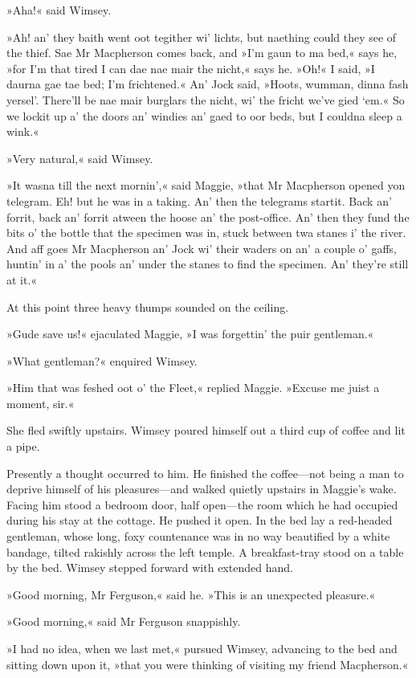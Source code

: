 »Aha!« said Wimsey.

»Ah! an' they baith went oot tegither wi' lichts, but naething could they see of the thief. Sae Mr Macpherson comes back, and »I'm gaun to ma bed,« says he, »for I'm that tired I can dae nae mair the nicht,« says he. »Oh!« I said, »I daurna gae tae bed; I'm frichtened.« An' Jock said, »Hoots, wumman, dinna fash yersel'. There'll be nae mair burglars the nicht, wi' the fricht we've gied `em.« So we lockit up a' the doors an' windies an' gaed to oor beds, but I couldna sleep a wink.«

»Very natural,« said Wimsey.

»It wasna till the next mornin',« said Maggie, »that Mr Macpherson opened yon telegram. Eh! but he was in a taking. An' then the telegrams startit. Back an' forrit, back an' forrit atween the hoose an' the post-office. An' then they fund the bits o' the bottle that the specimen was in, stuck between twa stanes i' the river. And aff goes Mr Macpherson an' Jock wi' their waders on an' a couple o' gaffs, huntin' in a' the pools an' under the stanes to find the specimen. An' they're still at it.«

At this point three heavy thumps sounded on the ceiling.

»Gude save us!« ejaculated Maggie, »I was forgettin' the puir gentleman.«

»What gentleman?« enquired Wimsey.

»Him that was feshed oot o' the Fleet,« replied Maggie. »Excuse me juist a moment, sir.«

She fled swiftly upstairs. Wimsey poured himself out a third cup of coffee and lit a pipe.

Presently a thought occurred to him. He finished the coffee—not being a man to deprive himself of his pleasures—and walked quietly upstairs in Maggie's wake. Facing him stood a bedroom door, half open—the room which he had occupied during his stay at the cottage. He pushed it open. In the bed lay a red-headed gentleman, whose long, foxy countenance was in no way beautified by a white bandage, tilted rakishly across the left temple. A breakfast-tray stood on a table by the bed. Wimsey stepped forward with extended hand.

»Good morning, Mr Ferguson,« said he. »This is an unexpected pleasure.«

»Good morning,« said Mr Ferguson snappishly.

»I had no idea, when we last met,« pursued Wimsey, advancing to the bed and sitting down upon it, »that you were thinking of visiting my friend Macpherson.«

